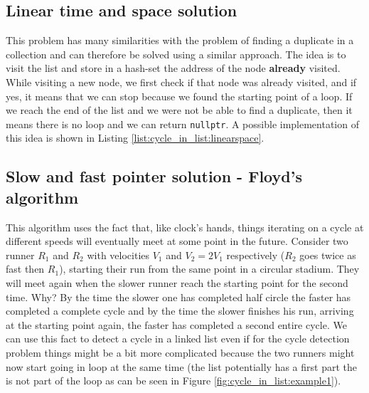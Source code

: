 \subsection{Linear time and space solution}
\label{cycle_in_list:sec:bruteforce}
This problem has many similarities with the problem of finding a duplicate in a collection and can
therefore be solved using a similar approach. The idea is to visit the list and store in a hash-set
the  address of the node \textbf{already} visited. While visiting a new node, we first check if that
node was already visited, and if yes, it means that we can stop because we found the starting point
of a loop. If we reach the end of the list and we were not be able to find a duplicate, then it
means there is no loop and we can return \lstinline[columns=fixed]{nullptr}. A possible
implementation of this idea is shown in Listing \ref{list:cycle_in_list:linearspace}.





\subsection{Slow and fast pointer solution - Floyd’s algorithm }
\label{cycle_in_list:sec:slowfast}
This algorithm\cite{cit::wiki::floyd} uses the fact that, like clock's hands, things iterating on a
cycle at different speeds will eventually meet at some point in the future. Consider two runner $R_1$
and $R_2$ with velocities $V_1$ and $V_2=2V_1$ respectively ($R_2$ goes twice as fast then $R_1$),
starting their run from the same point in a circular stadium. They will meet again when the slower
runner reach the starting point for the second time. Why? By the time the slower one has completed
half circle the faster has completed a complete cycle and by the time the slower finishes his run,
arriving at the starting point again, the faster has completed a second entire cycle. We can use
this fact to detect a cycle in a linked list even if for the cycle detection problem things might be
a bit more complicated because the two runners might now start going in loop at the same time (the
list potentially has a first part the is not part of the loop as can be seen in Figure
\ref{fig:cycle_in_list:example1}). 


